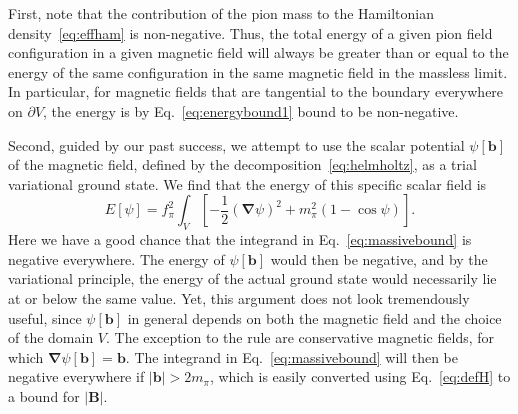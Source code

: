 \documentclass[pdflatex,iicol,sn-mathphys-num]{sn-jnl}
\let\de=\partial
\newcommand{\vek}[1]{\bm{#1}}%
\newcommand{\grad}{\vek\nabla}%
\newcommand{\bmag}{b}%
\begin{document}
First, note that the contribution of the pion mass to the Hamiltonian density~\eqref{eq:effham} is non-negative. Thus, the total energy of a given pion field configuration in a given magnetic field will always be greater than or equal to the energy of the same configuration in the same magnetic field in the massless limit. In particular, for magnetic fields that are tangential to the boundary everywhere on $\de V$, the energy is by Eq.~\eqref{eq:energybound1} bound to be non-negative.

Second, guided by our past success, we attempt to use the scalar potential $\psi[\vek\bmag]$ of the magnetic field, defined by the decomposition~\eqref{eq:helmholtz}, as a trial variational ground state. We find that the energy of this specific scalar field is
\begin{equation}
E[\psi]=f_\pi^2\int_V\left[-\frac12(\grad\psi)^2+m_\pi^2(1-\cos\psi)\right].
\label{eq:massivebound}
\end{equation}
Here we have a good chance that the integrand in Eq.~\eqref{eq:massivebound} is negative everywhere. The energy of $\psi[\vek\bmag]$ would then be negative, and by the variational principle, the energy of the actual ground state would necessarily lie at or below the same value. Yet, this argument does not look tremendously useful, since $\psi[\vek\bmag]$ in general depends on both the magnetic field and the choice of the domain $V$. The exception to the rule are conservative magnetic fields, for which $\grad\psi[\vek\bmag]=\vek\bmag$. The integrand in Eq.~\eqref{eq:massivebound} will then be negative everywhere if $|\vek\bmag|>2m_\pi$, which is easily converted using Eq.~\eqref{eq:defH} to a bound for $|\vek B|$.
\end{document}
